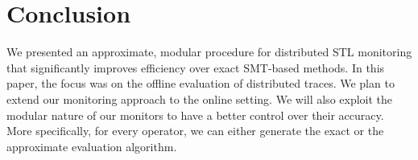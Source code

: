 \section{Conclusion} \label{sec:conclusion}



\alert{
We presented an approximate, modular procedure for distributed STL monitoring that significantly improves efficiency over exact SMT-based methods.
In this paper, the focus was on the offline evaluation of distributed traces.
We plan to extend our monitoring approach to the online setting.
We will also exploit the modular nature of our monitors to have a better control over their accuracy.
More specifically, for every operator, we can either generate the exact or the approximate evaluation algorithm.
}